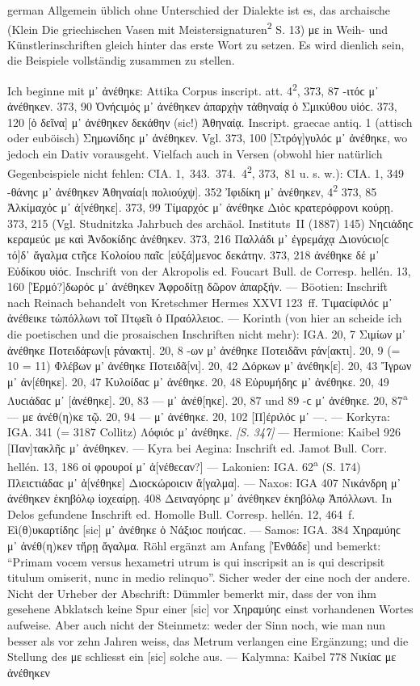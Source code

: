 \begin{otherlanguage*}{german}
Allgemein üblich ohne Unterschied der Dialekte ist es, das archaische (Klein Die griechischen Vasen mit Meistersignaturen\textsuperscript{2} S. 13) με in Weih- und Künstlerinschriften gleich hinter das erste Wort zu setzen. Es wird dienlich sein, die Beispiele vollständig zusammen zu stellen.

Ich beginne mit μ᾽ ἀνέθηκε: Attika Corpus inscript. att. 4\textsuperscript{2}, 373, 87 -ιτόϲ μ᾽ ἀνέθηκεν. 373, 90 Ὀνήϲιμός μ᾽ ἀνέθηκεν ἀπαρχὴν τἀθηναίᾳ ὁ Σμικύθου υἱόϲ. 373, 120 [ὁ δεῖνα] μ᾽ ἀνέθηκεν δεκάθην (sic!) Ἀθηναίᾳ. Inscript. graecae antiq. 1 (attisch oder euböisch) Σημωνίδηϲ μ᾽ ἀνέθηκεν. Vgl. 373, 100 [Στρόγ]γυλόϲ μ᾽ ἀνέθηκε, wo jedoch ein Dativ vorausgeht. Vielfach auch in Versen (obwohl hier natürlich Gegenbeispiele nicht fehlen: CIA. 1,~343.~374.~4\textsuperscript{2}, 373,~81 u. s. w.): CIA. 1, 349 -θάνηϲ μ᾽ ἀνέθηκεν Ἀθηναία[ι πολιούχψ]. 352 Ἰφιδίκη μ᾽ ἀνέθηκεν, 4\textsuperscript{2} 373, 85 Ἀλκίμαχόϲ μ᾽ ἀ[νέθηκε]. 373, 99 Τίμαρχόϲ μ᾽ ἀνέθηκε Διὸϲ κρατερόφρονι κούρῃ. 373, 215 (Vgl. Studnitzka Jahrbuch des archäol. Instituts~II (1887) 145) Νηϲιάδηϲ κεραμεύϲ με καὶ Ἀνδοκίδηϲ ἀνέθηκεν. 373, 216 Παλλάδι μ᾽ ἐγρεμάχᾳ Διονύϲιο[ϲ τό]δ᾽ ἄγαλμα ϲτῆϲε Κολοίου παῖϲ [εὐξά]μενοϲ δεκάτην. 373, 218 ἀνέθηκε δέ μ᾽ Εὐδίκου υἱόϲ. Inschrift von der Akropolis ed. Foucart Bull. de Corresp. hellén. 13, 160 [Ἑρμό?]δωρόϲ μ᾽ ἀνέθηκεν Ἀφροδίτῃ δῶρον ἀπαρξήν. — Böotien: Inschrift nach Reinach behandelt von Kretschmer Hermes XXVI 123~ff. Τιμαϲίφιλόϲ μ᾽ ἀνέθεικε τὠπόλλωνι τοῖ Πτῳεῖι ὁ Πραόλλειοϲ. — Korinth (von hier an scheide ich die poetischen und die prosaischen Inschriften nicht mehr): IGA. 20, 7 Σιμίων μ᾽ ἀνέθηκε Ποτειδάϝων[ι ϝάνακτι]. 20, 8 -ων μ’ ἀνέθηκε Ποτειδᾶνι ϝάν[ακτι]. 20, 9 (= 10 = 11) Φλέβων μ’ ἀνέθηκε Ποτειδᾶ[νι]. 20, 42 Δόρκων μ’ ἀνέθηκ[ε]. 20, 43 Ἴγρων μ᾽ ἀν[έθηκε]. 20, 47 Κυλοίδαϲ μ᾽ ἀνέθηκε. 20, 48 Εὐρυμήδηϲ μ᾽ ἀνέθηκε. 20, 49 Λυϲιάδαϲ μ᾽ [ἀνέθηκε]. 20, 83 — μ᾽ ἀνέθ[ηκε]. 20, 87 und 89 -ϲ μ᾽ ἀνέθηκε. 20, 87\textsuperscript{a} — με ἀνέθ(η)κε τῷ. 20, 94 — μ᾽ ἀνέθηκε. 20, 102 [Π]έριλόϲ μ᾽ —. — Korkyra: IGA. 341 (= 3187 Collitz) Λόφιόϲ μ᾽ ἀνέθηκε. \hypertarget{p347}{\emph{[S. 347]}}\label{p347} — Hermione: Kaibel 926 [Παν]τακλῆϲ μ᾽ ἀνέθηκεν. — Kyra bei Aegina: Inschrift ed. Jamot Bull. Corr. \mbox{hellén}. 13, 186 οἱ φρουροί μ᾽ ἀ[νέθεϲαν?] — Lakonien: IGA. 62\textsuperscript{a} (S. 174) Πλειϲτιάδαϲ μ᾽ ἀ[νέθηκε] Διοϲκώροιϲιν ἄ[γαλμα]. — Naxos: IGA 407 Νικάνδρη μ᾽ ἀνέθηκεν ἑκηβόλῳ ἰοχεαίρῃ. 408 Δειναγόρηϲ μ᾽ ἀνέθηκεν ἑκηβόλῳ Ἀπόλλωνι. In Delos gefundene Inschrift ed. Homolle Bull. Corresp. hellén. 12, 464~f. Εὶ(θ)υκαρτίδηϲ [sic] μ᾽ ἀνέθηκε ὁ Νάξιοϲ ποιήϲαϲ. — Samos: IGA. 384 Χηραμύηϲ μ᾽ ἀνέθ(η)κεν τἤρῃ ἄγαλμα. Röhl ergänzt am Anfang [Ἐνθάδε] und bemerkt: “Primam vocem versus hexametri utrum is qui inscripsit an is qui descripsit titulum omiserit, nunc in medio relinquo”. Sicher weder der eine noch der andere. Nicht der Urheber der Abschrift: Dümmler bemerkt mir, dass der von ihm gesehene Abklatsch keine Spur einer [sic] vor Χηραμύηϲ einst vorhandenen Wortes aufweise. Aber auch nicht der Steinmetz: weder der Sinn noch, wie man nun besser als vor zehn Jahren weiss, das Metrum verlangen eine Ergänzung; und die Stellung des με schliesst ein [sic] solche aus. —  Kalymna: Kaibel 778 Νικίαϲ με ἀνέθηκεν 
\end{otherlanguage*}

